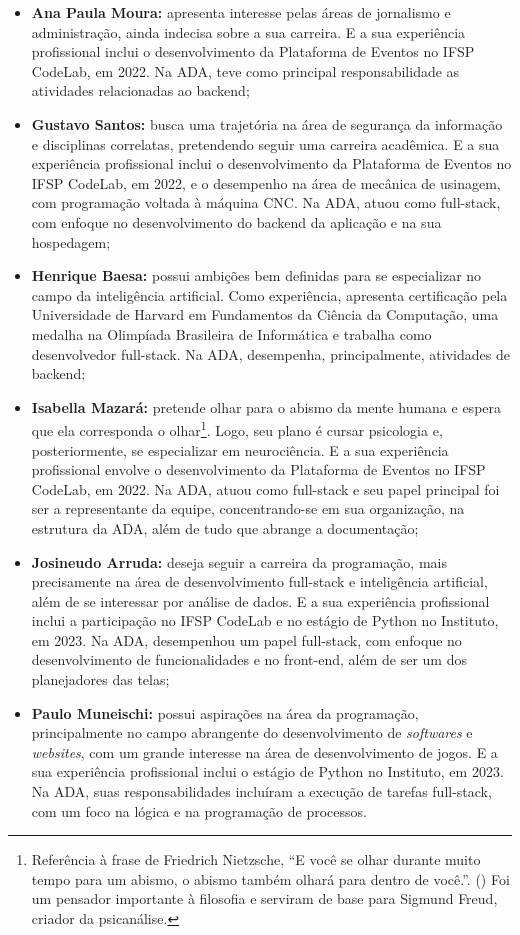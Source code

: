 \documentclass[12pt]{article}
\begin{document}
\begin{itemize}
    \item \textbf{Ana Paula Moura:} apresenta interesse pelas áreas de jornalismo e administração, ainda indecisa sobre a sua carreira. E a sua experiência profissional inclui o desenvolvimento da Plataforma de Eventos no IFSP CodeLab, em 2022. Na ADA, teve como principal responsabilidade as atividades relacionadas ao backend;
    \item \textbf{Gustavo Santos:} busca uma trajetória na área de segurança da informação e disciplinas correlatas, pretendendo seguir uma carreira acadêmica.  E a sua experiência profissional inclui o desenvolvimento da Plataforma de Eventos no IFSP CodeLab, em 2022, e o desempenho na área de mecânica de usinagem, com programação voltada à máquina CNC. Na ADA, atuou como full-stack, com enfoque no desenvolvimento do backend da aplicação e na sua hospedagem;
    \item \textbf{Henrique Baesa:} possui ambições bem definidas para se especializar no campo da inteligência artificial. Como experiência, apresenta certificação pela Universidade de Harvard em Fundamentos da Ciência da Computação, uma medalha na Olimpíada Brasileira de Informática e trabalha como desenvolvedor full-stack. Na ADA, desempenha, principalmente, atividades de backend;
    \item \textbf{Isabella Mazará:} pretende olhar para o abismo da mente humana e espera que ela corresponda o olhar\footnote{Referência à frase de Friedrich Nietzsche, “E você se olhar durante muito tempo para um abismo, o abismo também olhará para dentro de você.”. () Foi um pensador importante à filosofia e serviram de base para Sigmund Freud, criador da psicanálise.}. Logo, seu plano é cursar psicologia e, posteriormente, se especializar em neurociência. E a sua experiência profissional envolve o desenvolvimento da Plataforma de Eventos no IFSP CodeLab, em 2022. Na ADA, atuou como full-stack e seu papel principal foi ser a representante da equipe, concentrando-se em sua organização, na estrutura da ADA, além de tudo que abrange a documentação;
    \item \textbf{Josineudo Arruda:} deseja seguir a carreira da programação, mais precisamente na área de desenvolvimento full-stack e inteligência artificial, além de se interessar por análise de dados. E a sua experiência profissional inclui a participação no IFSP CodeLab e no estágio de Python no Instituto, em 2023. Na ADA, desempenhou um papel full-stack, com enfoque no desenvolvimento de funcionalidades e no front-end, além de ser um dos planejadores das telas;
    \item \textbf{Paulo Muneischi:} possui aspirações na área da programação, principalmente no campo abrangente do desenvolvimento de \textit{softwares} e \textit{websites}, com um grande interesse na área de desenvolvimento de jogos. E a sua experiência profissional inclui o estágio de Python no Instituto, em 2023. Na ADA, suas responsabilidades incluíram a execução de tarefas full-stack, com um foco na lógica e na programação de processos. 
\end{itemize}
\end{document}
